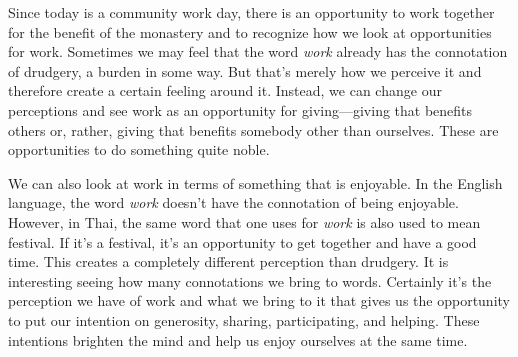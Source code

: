 
Since today is a community work day, there is an opportunity to work 
together for the benefit of the monastery and to recognize how we look 
at opportunities for work. Sometimes we may feel that the word 
\emph{work} already has the connotation of drudgery, a burden in some 
way. But that's merely how we perceive it and therefore create a 
certain feeling around it. Instead, we can change our perceptions and 
see work as an opportunity for giving---giving that benefits others or, 
rather, giving that benefits somebody other than ourselves. These are 
opportunities to do something quite noble.

We can also look at work in terms of something that is enjoyable. In 
the English language, the word \emph{work} doesn't have the connotation 
of being enjoyable. However, in Thai, the same word that one uses for 
\emph{work} is also used to mean festival. If it's a festival, it's an 
opportunity to get together and have a good time. This creates a 
completely different perception than drudgery. It is interesting seeing 
how many connotations we bring to words. Certainly it's the perception 
we have of work and what we bring to it that gives us the opportunity 
to put our intention on generosity, sharing, participating, and 
helping. These intentions brighten the mind and help us enjoy ourselves 
at the same time.

